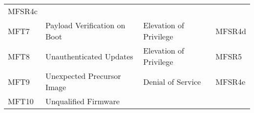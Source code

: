 \documentclass[0-thesis.tex]{subfiles}
\begin{document}
\begin{longtable}[]{@{}llll@{}}
\begin{minipage}[t]{0.09\columnwidth}
    MFSR4c\strut
    \end{minipage}\tabularnewline
    \begin{minipage}[t]{0.05\columnwidth}\raggedright\strut
    MFT7\strut
    \end{minipage} & \begin{minipage}[t]{0.44\columnwidth}\raggedright\strut
    Payload Verification on Boot\strut
    \end{minipage} & \begin{minipage}[t]{0.30\columnwidth}\raggedright\strut
    Elevation of Privilege\strut
    \end{minipage} & \begin{minipage}[t]{0.09\columnwidth}\raggedright\strut
    MFSR4d\strut
    \end{minipage}\tabularnewline
    \begin{minipage}[t]{0.05\columnwidth}\raggedright\strut
    MFT8\strut
    \end{minipage} & \begin{minipage}[t]{0.44\columnwidth}\raggedright\strut
    Unauthenticated Updates\strut
    \end{minipage} & \begin{minipage}[t]{0.30\columnwidth}\raggedright\strut
    Elevation of Privilege\strut
    \end{minipage} & \begin{minipage}[t]{0.09\columnwidth}\raggedright\strut
    MFSR5\strut
    \end{minipage}\tabularnewline
    \begin{minipage}[t]{0.05\columnwidth}\raggedright\strut
    MFT9\strut
    \end{minipage} & \begin{minipage}[t]{0.44\columnwidth}\raggedright\strut
    Unexpected Precursor Image\strut
    \end{minipage} & \begin{minipage}[t]{0.30\columnwidth}\raggedright\strut
    Denial of Service\strut
    \end{minipage} & \begin{minipage}[t]{0.09\columnwidth}\raggedright\strut
    MFSR4e\strut
    \end{minipage}\tabularnewline
    \begin{minipage}[t]{0.05\columnwidth}\raggedright\strut
    MFT10\strut
    \end{minipage} & \begin{minipage}[t]{0.44\columnwidth}\raggedright\strut
    Unqualified Firmware\strut

\end{minipage}
\end{longtable}
\end{document}
